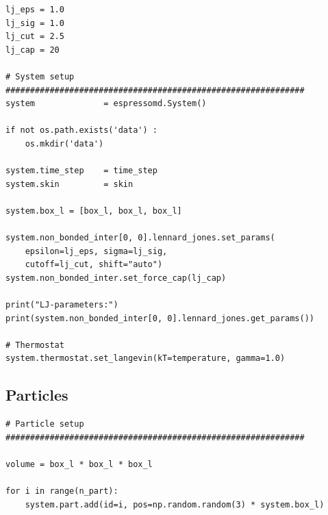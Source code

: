 \documentclass[
paper=a4,                       %
fontsize=11pt,                  %
twoside,                        %
footsepline,                    %
headsepline,                    %
headinclude=false,              %
footinclude=false,              %
pagesize,                       %
]{scrartcl}
\newtheorem{task}{Task}
\begin{document}
{{\begin{lstlisting}
lj_eps = 1.0
lj_sig = 1.0
lj_cut = 2.5
lj_cap = 20

# System setup
#############################################################
system              = espressomd.System()

if not os.path.exists('data') :
    os.mkdir('data')

system.time_step    = time_step
system.skin         = skin

system.box_l = [box_l, box_l, box_l]

system.non_bonded_inter[0, 0].lennard_jones.set_params(
    epsilon=lj_eps, sigma=lj_sig,
    cutoff=lj_cut, shift="auto")
system.non_bonded_inter.set_force_cap(lj_cap)

print("LJ-parameters:")
print(system.non_bonded_inter[0, 0].lennard_jones.get_params())

# Thermostat
system.thermostat.set_langevin(kT=temperature, gamma=1.0)
\end{lstlisting}


\subsection{Particles}

\begin{lstlisting}
# Particle setup
#############################################################

volume = box_l * box_l * box_l

for i in range(n_part):
    system.part.add(id=i, pos=np.random.random(3) * system.box_l)
\end{lstlisting}}\vspace{0,2cm}

   \vspace{1cm}}
\end{document}
